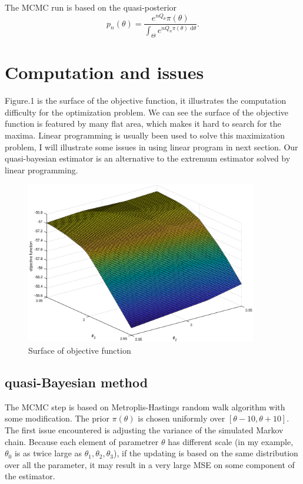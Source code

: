 \documentclass[12pt]{article}
\theoremstyle{plain} \newtheorem{theorem}{Theorem}
\theoremstyle{definition} \newtheorem{definition}{Definition}
\begin{document}
The MCMC run is based on the quasi-posterior
\begin{equation*}
    p_n(\theta) = \frac{e^{nQ_{\theta}}\pi(\theta)}{\int_{\Theta}e^{nQ_n\pi(\theta)\mbox{ d}\theta}}.
\end{equation*}

\section{Computation and issues}
\label{sec:computation-issues}

Figure.1 is the surface of the objective function, it illustrates the computation difficulty for the optimization problem. We can see the surface of the objective function is featured by many flat area, which makes it hard to search for the maxima. Linear programming is usually been used to solve this maximization problem, I will illustrate some issues in using linear program in next section. Our quasi-bayesian estimator is an alternative to the extremum estimator solved by linear programming.

\begin{figure}[h]
    \centering
    \includegraphics[width=0.9\textwidth]{figures/mesh.eps}
    \caption{Surface of objective function}
    \label{fig:lte-mean}
\end{figure}

\subsection{quasi-Bayesian method}
The MCMC step is based on Metroplis-Hastings random walk algorithm with some modification. The prior $\pi(\theta)$ is chosen uniformly over $[\theta-10, \theta+10]$.
The first issue encountered is adjusting the variance of the simulated Markov chain. Because each element of parametrer $\theta$ has different scale (in my example, $\theta_0$ is as twice large as $\theta_1,\theta_2,\theta_3$), if the updating is based on the same distribution over all the parameter, it may result in a very large MSE on some component of the estimator.
\end{document}
